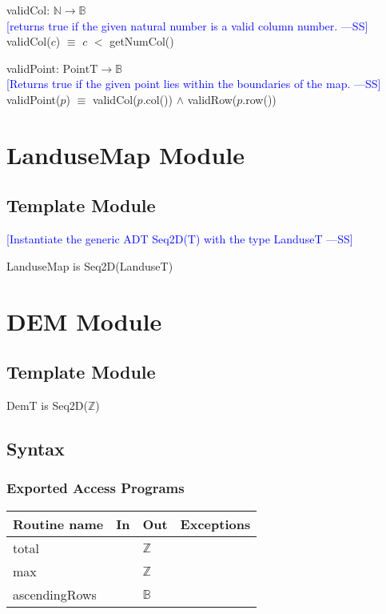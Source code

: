 \documentclass[12pt]{article}
\newcommand{\authornote}[3]{\textcolor{#1}{[#3 ---#2]}}
\newcommand{\authornote}[3]{}
\newcommand{\wss}[1]{\authornote{blue}{SS}{#1}}
\begin{document}
\noindent validCol: $\mathbb{N} \rightarrow \mathbb{B}$\\
\noindent \wss{returns true if the given natural number is a valid column
  number.}\\
  validCol($c$) $\equiv$ $c$ $<$ getNumCol()
  \medskip

\noindent validPoint: $\mbox{PointT} \rightarrow \mathbb{B}$\\
\noindent \wss{Returns true if the given point lies within the boundaries of the
  map.}\\
  validPoint($p$) $\equiv$ validCol($p$.col()) $\land$ validRow($p$.row())

\newpage

\section* {LanduseMap Module}

\subsection* {Template Module}

\wss{Instantiate the generic ADT Seq2D(T) with the type LanduseT}

\noindent LanduseMap is Seq2D(LanduseT)

\newpage

\section* {DEM Module}

\subsection* {Template Module}

DemT is Seq2D($\mathbb{Z}$)

\subsection* {Syntax}

\subsubsection* {Exported Access Programs}

\begin{tabular}{| l | l | l | p{6cm} |}
\hline
\textbf{Routine name} & \textbf{In} & \textbf{Out} & \textbf{Exceptions}\\
\hline
total & & $\mathbb{Z}$ & \\
\hline
max &  & $\mathbb{Z}$ & \\
\hline
ascendingRows & & $\mathbb{B}$ & \\
\hline
\end{tabular}
\end{document}
